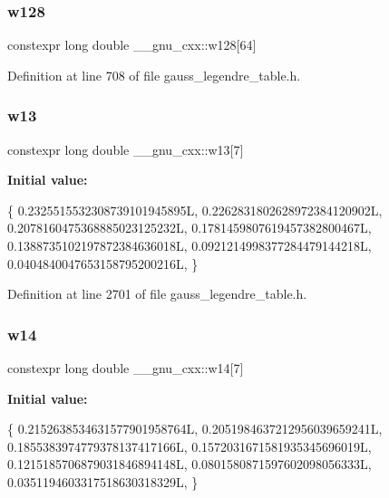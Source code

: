 \subsubsection{\texorpdfstring{w128}{w128}}
{\footnotesize\ttfamily constexpr long double \+\_\+\+\_\+gnu\+\_\+cxx\+::w128\mbox{[}64\mbox{]}}



Definition at line 708 of file gauss\+\_\+legendre\+\_\+table.\+h.

\mbox{\label{namespace____gnu__cxx_ada6939eb092714a9b14560ee1abe882c}} 
\subsubsection{\texorpdfstring{w13}{w13}}
{\footnotesize\ttfamily constexpr long double \+\_\+\+\_\+gnu\+\_\+cxx\+::w13\mbox{[}7\mbox{]}}

{\bfseries Initial value\+:}
\begin{DoxyCode}
\{
    0.2325515532308739101945895L,
    0.2262831802628972384120902L,
    0.2078160475368885023125232L,
    0.1781459807619457382800467L,
    0.1388735102197872384636018L,
    0.0921214998377284479144218L,
    0.0404840047653158795200216L,
  \}
\end{DoxyCode}


Definition at line 2701 of file gauss\+\_\+legendre\+\_\+table.\+h.

\mbox{\label{namespace____gnu__cxx_a5e5dfdb3ae5bc8ccf19b1ca2cc0f7066}} 
\subsubsection{\texorpdfstring{w14}{w14}}
{\footnotesize\ttfamily constexpr long double \+\_\+\+\_\+gnu\+\_\+cxx\+::w14\mbox{[}7\mbox{]}}

{\bfseries Initial value\+:}
\begin{DoxyCode}
\{
    0.2152638534631577901958764L,
    0.2051984637212956039659241L,
    0.1855383974779378137417166L,
    0.1572031671581935345696019L,
    0.1215185706879031846894148L,
    0.0801580871597602098056333L,
    0.0351194603317518630318329L,
  \}
\end{DoxyCode}


